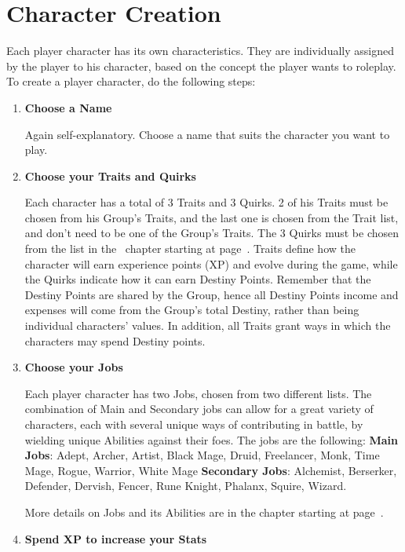 \section{Character Creation}\label{sec:creation}
\begin{multicols}{2}
Each player character has its own characteristics. They are individually assigned by the player to his character, based on the concept the player wants to roleplay. To create a player character, do the following steps:
\begin{enumerate}
\item \textbf{Choose a Name}

Again self-explanatory. Choose a name that suits the character you want to play.

\item \textbf{Choose your Traits and Quirks}

Each character has a total of 3 Traits and 3 Quirks. 2 of his Traits must be chosen from his Group’s Traits, and the last one is chosen from the Trait list, and don’t need to be one of the Group's Traits. The 3 Quirks must be chosen from the list in the~\pageref{ch:characters} chapter starting at page~\pageref{subsec:quirklist}. Traits define how the character will earn experience points (XP) and evolve during the game, while the Quirks indicate how it can earn Destiny Points. Remember that the Destiny Points are shared by the Group, hence all Destiny Points income and expenses will come from the Group's total Destiny, rather than being individual characters’ values. In addition, all Traits grant ways in which the characters may spend Destiny points.

\item \textbf{Choose your Jobs}

Each player character has two Jobs, chosen from two different lists. The combination of Main and Secondary jobs can allow for a great variety of characters, each with several unique ways of contributing in battle, by wielding unique Abilities against their foes. The jobs are the following:
\textbf{Main Jobs}: Adept, Archer, Artist, Black Mage, Druid, Freelancer, Monk, Time Mage, Rogue, Warrior, White Mage
\textbf{Secondary Jobs}: Alchemist, Berserker, Defender, Dervish, Fencer, Rune Knight, Phalanx, Squire, Wizard.

More details on Jobs and its Abilities are in the  chapter starting at page~\pageref{sec:jobs-summary}.

\item \textbf{Spend XP to increase your Stats}


\end{enumerate}
\end{multicols}
